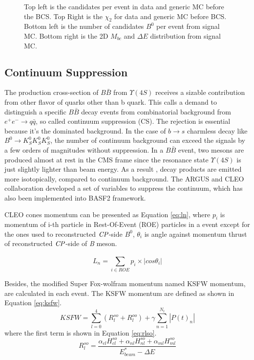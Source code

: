 \begin{figure}[H]
\begin{minipage}[b]{0.5\linewidth}
	\end{minipage}
	
	\caption{Top left is the candidates per event in data and generic MC before the BCS. Top Right is the $\chi_2$ for data and generic MC before BCS. Bottom left is the number of candidates $B^0$ per event from signal MC. Bottom right is the 2D $M_{bc}$ and $\Delta E$ distribution from signal MC.}
	\label{fig:b0dist}
\end{figure}

\subsection{Continuum Suppression}
The production cross-section of $B\bar{B}$ from $\Upsilon{(4S)}$ receives a sizable contribution from other flavor of quarks other than b quark. This calls a demand to distinguish a specific $B\bar{B}$ decay events from combinatorial background from $e^+e^- \to q\bar{q}$, so called continuum suppression (CS). The rejection is essential because it's the dominated background.  In the case of $b \to s$ charmless decay like $B^0 \to K_S^0  K_S^0  K_S^0$, the number of continuum background can exceed the signals by a few orders of magnitudes without suppression. In a $B\bar{B}$ event, two mesons are produced almost at rest in the CMS frame since the resonance state $\Upsilon(4S)$ is  just slightly lighter than beam energy. As a result	, decay products are emitted more isotopically, compared to continuum background. The ARGUS and CLEO collaboration\cite{Bevan_2014} developed a set of variables to suppress the continuum, which has also been implemented into BASF2 framework. 

CLEO cones momentum can be presented as Equation \ref{eq:ln}, where $ p_i $ is momentum of i-th particle in Rest-Of-Event (ROE) particles in a event except for the ones used to reconstructed $\it{CP}$-side $B^0$, $\theta_i$ is angle against momentum thrust of reconstructed $\it{CP}$-side of \textit{B} meson.

\begin{equation}\label{eq:ln}
L_n = \sum_{i\in ROE}^{} p_i \times |cos\theta_i|
\end{equation}

Besides, the modified Super Fox-wolfram momentum named  KSFW momentum, are calculated in each event. The KSFW momentum are defined as shown in Equation \ref{eq:ksfw}. 
\begin{equation}\label{eq:ksfw}
KSFW = \sum_{l=0}^{4}( R_l^{so} + R_l^{oo}) + \gamma \sum_{n=1}^{N_t}|P(t)_n|
\end{equation}
where the first term is shown in Equation \ref{eq:rlso}.
\begin{equation}\label{eq:rlso}
R_l^{so} = \frac{\alpha_{cl}H_{cl}^{so} +
				\alpha_{nl}H_{nl}^{so}+
			\alpha_{ml}H_{ml}^{so}}{E^*_{beam}-\Delta E}
\end{equation}

